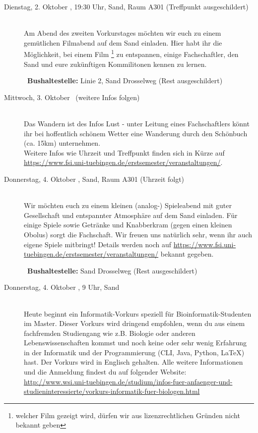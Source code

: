 \begin{description}
\item[Dienstag, 2. Oktober \Jahr, 19:30 Uhr, Sand, Raum A301 (Treffpunkt ausgeschildert)]\ \\
Am Abend des zweiten Vorkurstages möchten wir euch zu einem gemütlichen Filmabend auf dem Sand einladen.
Hier habt ihr die Möglichkeit, bei einem Film \footnote{welcher Film gezeigt wird, dürfen wir aus lizenzrechtlichen Gründen nicht bekannt geben} zu entspannen, einige Fachschaftler, den Sand und eure zukünftigen Kommilitonen kennen zu lernen.

~\textbf{Bushaltestelle:} Linie 2, Sand Drosselweg (Rest ausgeschildert)

\item[Mittwoch, 3. Oktober \Jahr~(weitere Infos folgen)]\ \\
Das Wandern ist des Infos Lust - unter Leitung eines Fachschaftlers könnt ihr bei hoffentlich schönem Wetter eine Wanderung durch den Schönbuch (ca. 15km) unternehmen. \\
Weitere Infos wie Uhrzeit und Treffpunkt finden sich in Kürze auf \url{https://www.fsi.uni-tuebingen.de/erstsemester/veranstaltungen/}.

\item[Donnerstag, 4. Oktober \Jahr, Sand, Raum A301 (Uhrzeit folgt)]\ \\
Wir möchten euch zu einem kleinen (analog-) Spieleabend mit guter Gesellschaft und entspannter Atmosphäre auf dem Sand einladen. Für einige Spiele sowie Getränke und Knabberkram (gegen einen kleinen Obolus) sorgt die Fachschaft. Wir freuen uns natürlich sehr, wenn ihr auch eigene Spiele mitbringt! Details werden noch auf \url{https://www.fsi.uni-tuebingen.de/erstsemester/veranstaltungen/} bekannt gegeben.

~\textbf{Bushaltestelle:} Sand Drosselweg (Rest ausgeschildert)

\ifmaster
\ifbinfo
\item[Donnerstag, 4. Oktober \Jahr, 9 Uhr, Sand]\ \\
 Heute beginnt ein Informatik-Vorkurs speziell für Bioinformatik-Studenten im Master. Dieser Vorkurs wird dringend empfohlen, wenn du aus einem fachfremden Studiengang wie z.B. Biologie oder anderen Lebenswissenschaften kommst und noch keine oder sehr wenig Erfahrung in der Informatik und der Programmierung (CLI, Java, Python, \LaTeX) hast. Der Vorkurs wird in Englisch gehalten. Alle weitere Informationen und die Anmeldung findest du auf folgender Website: \\ \url{http://www.wsi.uni-tuebingen.de/studium/infos-fuer-anfaenger-und-studieninteressierte/vorkurs-informatik-fuer-biologen.html}


\end{description}
